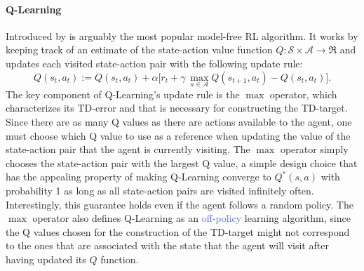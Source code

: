 \paragraph{\textbf{\uppercase{Q}-\uppercase{L}earning}} Introduced by \citet{watkins1992q} is arguably the most popular model-free RL algorithm. It works by keeping track of an estimate of the state-action value function $Q: \mathcal{S} \times \mathcal{A} \rightarrow \Re$ and updates each visited state-action pair with the following update rule:
\begin{equation}
Q(s_t,a_t):=Q(s_t,a_t) + \alpha\big[r_t + \gamma \:\underset{a\in \mathcal{A}}{\max} Q(s_{t+1},a_t) - Q(s_t, a_t) \big].
\label{eq:q_learning}
\end{equation}
The key component of Q-Learning's update rule is the $\max$ operator, which characterizes its TD-error and that is necessary for constructing the TD-target. Since there are as many Q values as there are actions available to the agent, one must choose which Q value to use as a reference when updating the value of the state-action pair that the agent is currently visiting. The $\max$ operator simply chooses the state-action pair with the largest Q value, a simple design choice that has the appealing property of making Q-Learning converge to $Q^{*}(s, a)$ with probability 1 as long as all state-action pairs are visited infinitely often. Interestingly, this guarantee holds even if the agent follows a random policy. The $\max$ operator also defines Q-Learning as an \textcolor{RoyalBlue}{off-policy} learning algorithm, since the Q values chosen for the construction of the TD-target might not correspond to the ones that are associated with the state that the agent will visit after having updated its $Q$ function.

